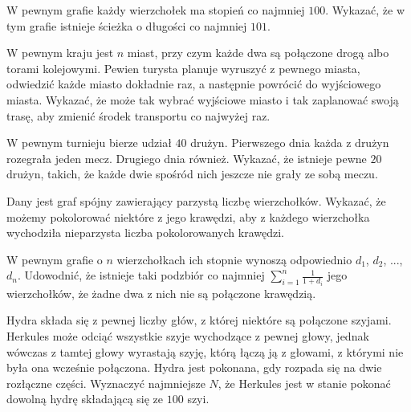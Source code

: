\begin{problem}{1}
	W pewnym grafie każdy wierzchołek ma stopień co najmniej $100$. Wykazać, że w tym grafie istnieje ścieżka o długości co najmniej $101$.
\end{problem}

\begin{problem}{2}
	W pewnym kraju jest $n$ miast, przy czym każde dwa są połączone drogą albo torami kolejowymi. Pewien turysta planuje wyruszyć z pewnego miasta, odwiedzić każde miasto dokładnie raz, a następnie powrócić do wyjściowego miasta. Wykazać, że może tak wybrać wyjściowe miasto i tak zaplanować swoją trasę, aby zmienić środek transportu co najwyżej raz.
\end{problem}

\begin{problem}{3}
	W pewnym turnieju bierze udział $40$ drużyn. Pierwszego dnia każda z drużyn rozegrała jeden mecz. Drugiego dnia również. Wykazać, że istnieje pewne $20$ drużyn, takich, że każde dwie spośród nich jeszcze nie grały ze sobą meczu.
\end{problem}

\begin{problem}{4}
	Dany jest graf spójny zawierający parzystą liczbę wierzchołków. Wykazać, że możemy pokolorować niektóre z jego krawędzi, aby z każdego wierzchołka wychodziła nieparzysta liczba pokolorowanych krawędzi.
\end{problem}


\begin{problem}{5}
	W pewnym grafie o $n$ wierzchołkach ich stopnie wynoszą odpowiednio $d_1$, $d_2$, ..., $d_n$. Udowodnić, że istnieje taki podzbiór co najmniej $\sum^{n}_{i = 1} \frac{1}{1 + d_i}$ jego wierzchołków, że żadne dwa z nich nie są połączone krawędzią.
\end{problem}

\begin{problem}{6}
	Hydra składa się z pewnej liczby głów, z której niektóre są połączone szyjami. Herkules może odciąć wszystkie szyje wychodzące z pewnej głowy, jednak wówczas z tamtej głowy wyrastają szyję, którą łączą ją z głowami, z którymi nie była ona wcześnie połączona. Hydra jest pokonana, gdy rozpada się na dwie rozłączne części. Wyznaczyć najmniejsze $N$, że Herkules jest w stanie pokonać dowolną hydrę składającą się ze $100$ szyi.
\end{problem}
